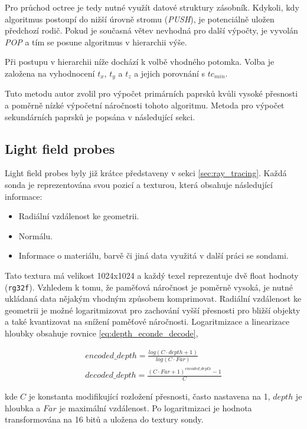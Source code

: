 Pro průchod octree je tedy nutné využít datové struktury zásobník. Kdykoli, kdy algoritmus postoupí do nižší úrovně stromu (\textit{PUSH}), je potenciálně uložen předchozí rodič. Pokud je současná větev nevhodná pro další výpočty, je vyvolán \textit{POP} a tím se posune algoritmus v hierarchii výše. 

Při postupu v hierarchii níže dochází k volbě vhodného potomka. Volba je založena na vyhodnocení $t_x$, $t_y$ a $t_z$ a jejich porovnání s $tc_{min}$.

Tuto metodu autor zvolil pro výpočet primárních paprsků kvůli vysoké přesnosti a poměrně nízké výpočetní náročnosti tohoto algoritmu. Metoda pro výpočet sekundárních paprsků je popsána v následující sekci.



\subsection{Light field probes}\label{sec:lfp_design}
Light field probes byly již krátce představeny v sekci \ref{sec:ray_tracing}. Každá sonda je reprezentována svou pozicí a texturou, která obsahuje následující informace:
\begin{itemize}
 \item Radiální vzdálenost ke geometrii.
 \item Normálu.
 \item Informace o materiálu, barvě či jiná data využitá v další práci se sondami.
\end{itemize}

Tato textura má velikost 1024x1024 a každý texel reprezentuje dvě float hodnoty (\texttt{rg32f}). Vzhledem k tomu, že paměťová náročnost je poměrně vysoká, je nutné ukládaná data nějakým vhodným způsobem komprimovat. Radiální vzdálenost ke geometrii je možné logaritmizovat pro zachování vyšší přesnosti pro bližší objekty a také kvantizovat na snížení paměťové náročnosti. Logaritmizace a linearizace hloubky obsahuje rovnice \ref{eq:depth_econde_decode},

\begin{equation} \label{eq:depth_econde_decode}
	\begin{gathered}
		encoded\_depth = \frac{log(C \cdot depth + 1)}{log(C \cdot Far)}\\
		decoded\_depth = \frac{(C \cdot Far + 1)^{encoded\_depth} - 1}{C}
	\end{gathered}
\end{equation}

kde $C$ je konstanta modifikující rozložení přesnosti, často nastavena na 1, $depth$ je hloubka a $Far$ je maximální vzdálenost. Po logaritmizaci je hodnota transformována na 16 bitů a uložena do textury sondy.

